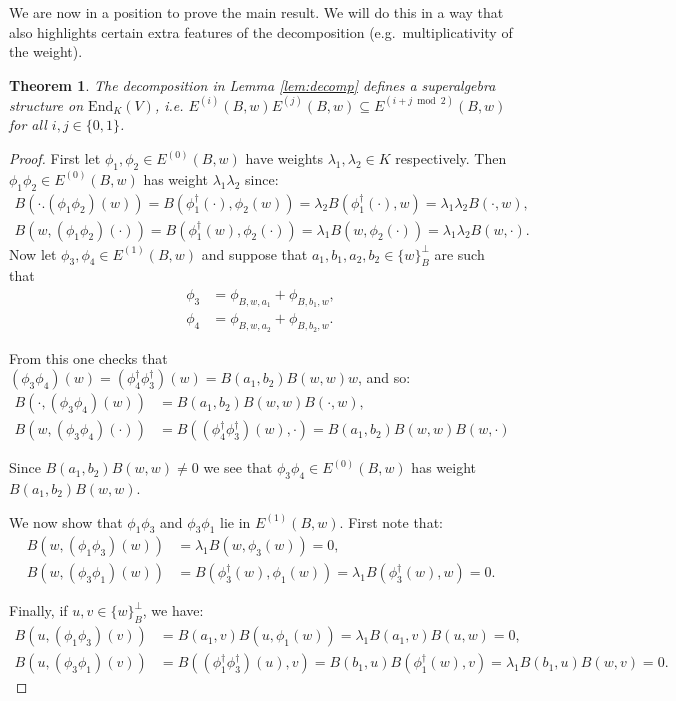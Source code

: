 \documentclass{amsart}
\theoremstyle{plain}
\newtheorem{theorem}{Theorem}[section]
\theoremstyle{definition}
\begin{document}
We are now in a position to prove the main result. We will do this in a way that also highlights certain extra features of the decomposition (e.g.\ multiplicativity of the weight).
\begin{theorem}
\label{thm:superalg}
The decomposition in Lemma \ref{lem:decomp} defines a superalgebra structure on $\text{End}_K(V)$, i.e. $E^{(i)}(B,w)E^{(j)}(B,w) \subseteq E^{(i+j \bmod 2)}(B,w)$ for all $i,j\in\{0,1\}$.
\end{theorem}

\begin{proof}
First let $\phi_1,\phi_2\in E^{(0)}(B,w)$ have weights $\lambda_1, \lambda_2\in K$ respectively. Then $\phi_1\phi_2\in E^{(0)}(B,w)$ has weight $\lambda_1\lambda_2$ since:
\begin{align*}
    B(\cdot. (\phi_1\phi_2)(w)) = B(\phi_1^\dagger(\cdot),\phi_2(w)) = \lambda_2 B(\phi_1^\dagger(\cdot), w) = \lambda_1\lambda_2 B(\cdot, w), \\
    B(w, (\phi_1\phi_2)(\cdot)) = B(\phi_1^\dagger(w),\phi_2(\cdot)) = \lambda_1 B(w,\phi_2(\cdot)) = \lambda_1\lambda_2 B(w,\cdot).
\end{align*}
Now let $\phi_3,\phi_4\in E^{(1)}(B,w)$ and suppose that $a_1, b_1, a_2, b_2\in \{w\}_B^{\perp}$ are such that \begin{align*}\phi_3 &= \phi_{B,w,a_1} + \phi_{B,b_1,w},\\ \phi_4 &= \phi_{B,w,a_2} + \phi_{B,b_2,w}.\end{align*} 

From this one checks that $(\phi_3\phi_4)(w) = (\phi_4^\dagger\phi_3^\dagger)(w) = B(a_1,b_2)B(w,w) w$, and so:
\begin{align*}
    B(\cdot, (\phi_3\phi_4)(w)) &= B(a_1,b_2)B(w,w) B(\cdot,w),\\
    B(w,(\phi_3\phi_4)(\cdot)) &= B((\phi_4^\dagger\phi_3^\dagger)(w),\cdot) = B(a_1,b_2)B(w,w)B(w,\cdot)
\end{align*}

Since $B(a_1,b_2)B(w,w)\neq 0$ we see that $\phi_3\phi_4\in E^{(0)}(B,w)$ has weight $B(a_1,b_2)B(w,w)$.

We now show that $\phi_1\phi_3$ and $\phi_3\phi_1$ lie in $E^{(1)}(B,w)$. First note that:
\begin{align*}
    B(w,(\phi_1\phi_3)(w)) &= \lambda_1 B(w,\phi_3(w)) = 0,\\
    B(w,(\phi_3\phi_1)(w)) &= B(\phi_3^\dagger(w),\phi_1(w)) = \lambda_1 B(\phi_3^\dagger(w),w) = 0.
\end{align*}

Finally, if $u,v\in\{w\}_B^{\perp}$, we have:
\begin{align*}
    B(u,(\phi_1\phi_3)(v)) &= B(a_1,v)B(u,\phi_1(w)) = \lambda_1 B(a_1,v)B(u,w) = 0, \\
    B(u,(\phi_3\phi_1)(v)) &= B((\phi_1^\dagger\phi_3^\dagger)(u),v) = B(b_1,u)B(\phi_1^\dagger(w),v) = \lambda_1 B(b_1,u)B(w,v) = 0.
\end{align*}
\end{proof}
\end{document}
